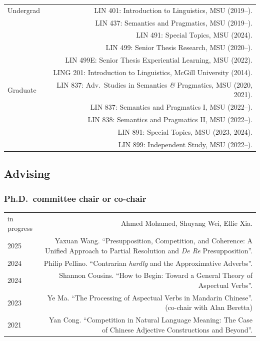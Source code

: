 \documentclass[12pt,letterpaper,twoside]{article}
\makeatletter
\newenvironment{cvsection}{%
  \begin{longtable}[l]{@{}L@{} @{}R@{}}
}{%
  \end{longtable}
}
\makeatother
\begin{document}
\begin{cvsection}
  Undergrad & LIN 401: Introduction to Linguistics, MSU (2019--).\\
            & LIN 437: Semantics and Pragmatics, MSU (2019--).\\
            & LIN 491: Special Topics, MSU (2024).\\
            & LIN 499: Senior Thesis Research, MSU (2020--).\\
            & LIN 499E: Senior Thesis Experiential Learning, MSU (2022).\\
            & LING 201: Introduction to Linguistics, McGill University (2014).\\
  Graduate & LIN 837: Adv.\ Studies in Semantics \emph{\&} Pragmatics, MSU (2020, 2021).\\
           & LIN 837: Semantics and Pragmatics I, MSU (2022--).\\
           & LIN 838: Semantics and Pragmatics II, MSU (2022--).\\
           & LIN 891: Special Topics, MSU (2023, 2024).\\
           & LIN 899: Independent Study, MSU (2022--).\\
\end{cvsection}

\subsection*{Advising}

\subsubsection*{Ph.D.~committee chair or co-chair}

\begin{cvsection}
  in progress & Ahmed Mohamed, Shuyang Wei, Ellie Xia.\\
  2025 & Yaxuan Wang. ``Presupposition, Competition, and Coherence: A Unified Approach to Partial Resolution and \emph{De Re} Presupposition''.\\
  2024 & Philip Pellino. ``Contrarian \emph{hardly} and the Approximative Adverbs''.\\
  2024 & Shannon Cousins. ``How to Begin: Toward a General Theory of Aspectual Verbs''.\\
  2023 & Ye Ma. ``The Processing of Aspectual Verbs in Mandarin Chinese''. (co-chair with Alan Beretta)\\
  2021 & Yan Cong. ``Competition in Natural Language Meaning: The Case of Chinese Adjective Constructions and Beyond''.\\
\end{cvsection}
\end{document}
